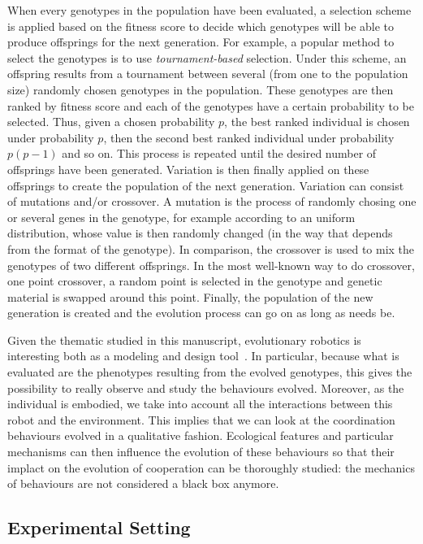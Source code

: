     When every genotypes in the population have been evaluated, a selection scheme is applied based on the fitness score to decide which genotypes will be able to produce offsprings for the next generation. For example, a popular method to select the genotypes is to use \emph{tournament-based} selection. Under this scheme, an offspring results from a tournament between several (from one to the population size) randomly chosen genotypes in the population. These genotypes are then ranked by fitness score and each of the genotypes have a certain probability to be selected. Thus, given a chosen probability $p$, the best ranked individual is chosen under probability $p$, then the second best ranked individual under probability $p(p-1)$ and so on. This process is repeated until the desired number of offsprings have been generated. Variation is then finally applied on these offsprings to create the population of the next generation. Variation can consist of mutations and/or crossover. A mutation is the process of randomly chosing one or several genes in the genotype, for example according to an uniform distribution, whose value is then randomly changed (in the way that depends from the format of the genotype). In comparison, the crossover is used to mix the genotypes of two different offsprings. In the most well-known way to do crossover, one point crossover, a random point is selected in the genotype and genetic material is swapped around this point. Finally, the population of the new generation is created and the evolution process can go on as long as needs be.

    Given the thematic studied in this manuscript, evolutionary robotics is interesting both as a modeling and design tool~\parencite{Trianni2014b, Doncieux2015a}. In particular, because what is evaluated are the phenotypes resulting from the evolved genotypes, this gives the possibility to really observe and study the behaviours evolved. Moreover, as the individual is embodied, we take into account all the interactions between this robot and the environment. This implies that we can look at the coordination behaviours evolved in a qualitative fashion. Ecological features and particular mechanisms can then influence the evolution of these behaviours so that their implact on the evolution of cooperation can be thoroughly studied: the mechanics of behaviours are not considered a black box anymore.



  \subsection{Experimental Setting}

